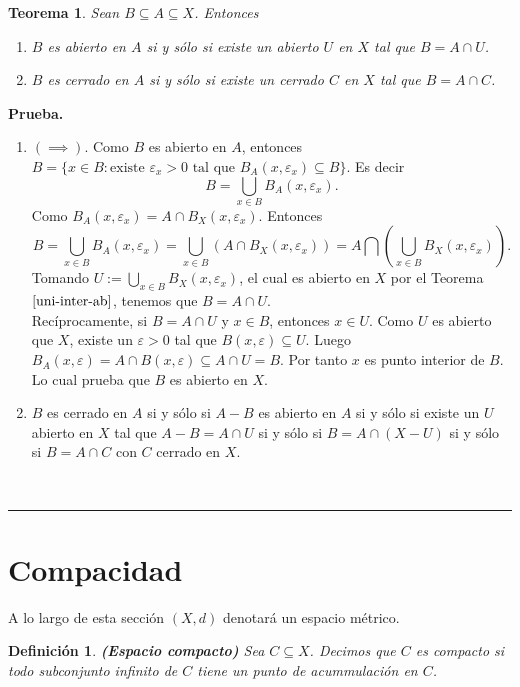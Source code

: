 \documentclass[x11names, 12pt]{book}
\newtheorem{definicion}{Definición}
\newtheorem{teorema}{Teorema}
\newenvironment{prueba}[1][Prueba]{\noindent\textbf{#1.} }{\ \rule{0.5em}{0.5em}}
\begin{document}
\begin{teorema}\label{ab-cerr-subesp}
Sean $B\subseteq  A\subseteq X$. Entonces
\begin{enumerate}
    \item $B$ es abierto en $A$ si y sólo si existe un abierto $U$ en $X$ tal que $B=A\cap U$.
    \item  $B$ es cerrado en $A$ si y sólo si existe un cerrado $C$ en $X$ tal que $B=A\cap C$.
\end{enumerate}
\end{teorema}
\begin{prueba}
\begin{enumerate}
    \item $(\implies)$. Como $B$ es abierto en $A$, entonces $B=\{x\in B: \text{existe $\varepsilon_x >0$ tal que $B_A(x, \varepsilon_x)\subseteq B$}\}$. Es decir
\[B=\bigcup_{x\in {B}}B_A(x, \varepsilon_x).\]
Como $B_A(x, \varepsilon_x) =A \cap B_X(x, \varepsilon_x).$ Entonces
\[B=\bigcup_{x\in B}B_A(x, \varepsilon_x) =\bigcup_{x\in B} \left( A \cap B_X(x, \varepsilon_x)\right)=A \bigcap  \left( \bigcup_{x\in B} B_X(x, \varepsilon_x)\right).\]
Tomando $U:=\bigcup_{x\in B} B_X(x, \varepsilon_x)$, el cual es abierto en $X$ por el Teorema $\ref{uni-inter-ab}$, tenemos que $B=A\cap U$.\\
Recíprocamente, si $B=A\cap U$ y $x\in B$, entonces $x\in U$. Como $U$ es abierto que $X$, existe un $\varepsilon>0$ tal que $B(x, \varepsilon)\subseteq U$. Luego $B_A(x, \varepsilon)=A\cap  B(x, \varepsilon) \subseteq A\cap U=B$. Por tanto $x$ es punto interior de $B$. Lo cual prueba que $B$ es abierto en $X$.
\item $B$ es cerrado en $A$ si y sólo si $A-B$ es abierto en $A$ si y sólo si existe un $U$ abierto en $X$ tal que $A-B=A\cap U$ si y sólo si $B=A\cap (X-U)$ si y sólo si $B=A\cap C$ con $C$ cerrado en $X$.
\end{enumerate}


\end{prueba}


\section{Compacidad}
A lo largo de esta sección $(X,d)$ denotará un espacio métrico.

\begin{definicion}\textbf{(Espacio compacto)}
    Sea $C\subseteq X$. Decimos que $C$ es compacto si todo subconjunto infinito de $C$ tiene un punto de acummulación en $C$.
\end{definicion}
\end{document}
